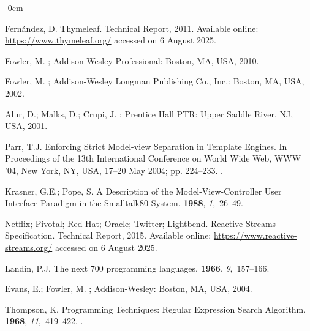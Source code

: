 \documentclass[software,article,accept,pdftex,moreauthors]{Definitions/mdpi}
\begin{document}
\begin{adjustwidth}{-\extralength}{0cm}
\begin{thebibliography}{999}
Fernández, D.
\newblock Thymeleaf.
\newblock Technical Report, 2011. Available online: \url{https://www.thymeleaf.org/} accessed on 6 August 2025.

Fowler, M.
; Addison-Wesley Professional: Boston, MA, USA, 2010.

Fowler, M.
; Addison-Wesley
  Longman Publishing Co., Inc.: Boston, MA, USA, 2002.

Alur, D.; Malks, D.; Crupi, J.
;
  Prentice Hall PTR: Upper Saddle River, NJ, USA, 2001.

Parr, T.J.
\newblock Enforcing Strict Model-view Separation in Template Engines.
\newblock In Proceedings of the 13th International
  Conference on World Wide Web, WWW '04, New York, NY, USA, 17--20 May 2004; pp.
  224--233.
.

Krasner, G.E.; Pope, S.
\newblock A Description of the Model-View-Controller User Interface Paradigm in
  the Smalltalk80 System.
 {\bf 1988}, {\em
  1},~26--49.

{Netflix}; {Pivotal}; {Red Hat}; {Oracle}; {Twitter}; {Lightbend}.
\newblock Reactive Streams Specification.
\newblock Technical Report, 2015. Available online: \url{https://www.reactive-streams.org/} accessed on 6 August 2025.

Landin, P.J.
\newblock The next 700 programming languages.
 {\bf 1966}, {\em 9},~157--166.

Evans, E.; Fowler, M.
; Addison-Wesley: Boston, MA, USA, 2004.

Thompson, K.
\newblock Programming Techniques: Regular Expression Search Algorithm.
 {\bf 1968}, {\em 11},~419–422.
.


\end{thebibliography}
\end{adjustwidth}
\end{document}
